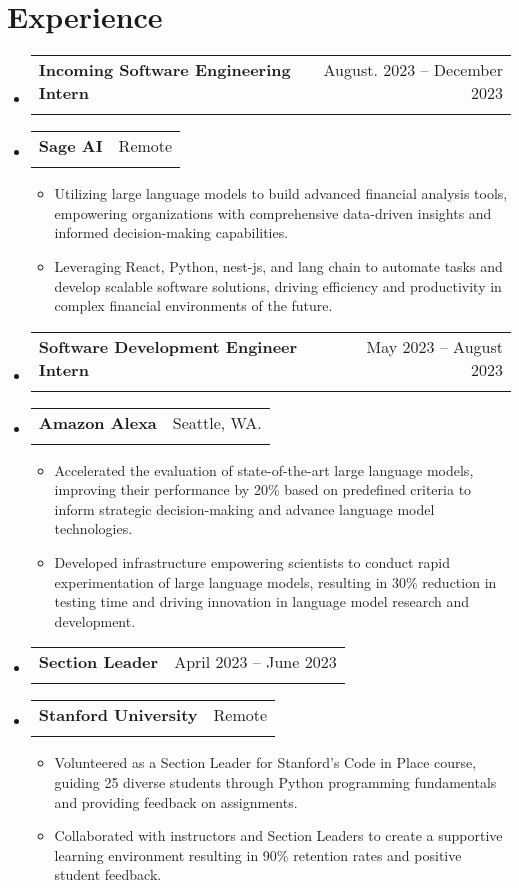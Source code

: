 \documentclass[letterpaper,11pt]{article}
\makeatletter
\newcommand{\resumeItem}[1]{
  \item\small{
    {#1 \vspace{-2pt}}
  }
}
\newcommand{\resumeSubheading}[4]{
  \vspace{-2pt}\item
    \begin{tabular*}{0.97\textwidth}[t]{l@{\extracolsep{\fill}}r}
      \textbf{#1} & #2 \\
      \textit{\small#3} & \textit{\small #4} \\
    \end{tabular*}\vspace{-7pt}
}
\newcommand{\resumeSubHeadingListStart}{\begin{itemize}[leftmargin=0.15in, label={}]}
\newcommand{\resumeSubHeadingListEnd}{\end{itemize}}
\newcommand{\resumeItemListStart}{\begin{itemize}}
\newcommand{\resumeItemListEnd}{\end{itemize}\vspace{-5pt}}
\makeatother
\begin{document}
\section{Experience}
\resumeSubHeadingListStart
\resumeSubheading
{Incoming Software Engineering Intern}{August. 2023 -- December 2023}
{\vspace{-20pt}}{\vspace{-20pt}}
\vspace{-10pt}
\resumeSubheading
{Sage AI}{Remote}
{}{}
\resumeItemListStart
\vspace{-10pt}
\resumeItem{Utilizing large language models to build advanced financial analysis tools, empowering organizations with comprehensive data-driven insights and informed decision-making capabilities.}
\resumeItem{Leveraging React, Python, nest-js, and lang chain to automate tasks and develop scalable software solutions, driving efficiency and productivity in complex financial environments of the future.}
\resumeItemListEnd
\resumeSubHeadingListEnd

\resumeSubHeadingListStart
\resumeSubheading 
{Software Development Engineer Intern}{May 2023 -- August 2023}
{\vspace{-20pt}}{\vspace{-20pt}}
\vspace{-10pt}
\resumeSubheading
{Amazon Alexa}{Seattle, WA.}
{}{}
\resumeItemListStart
\vspace{-10pt}
\resumeItem{Accelerated the evaluation of state-of-the-art large language models, improving their performance by 20\% based on predefined criteria to inform strategic decision-making and advance language model technologies.}
\resumeItem{Developed infrastructure empowering scientists to conduct rapid experimentation of large language models, resulting in 30\% reduction in testing time and driving innovation in language model research and development.}
\resumeItemListEnd
\resumeSubHeadingListEnd

\resumeSubHeadingListStart
\resumeSubheading
{Section Leader}{April 2023 -- June 2023}
{\vspace{-20pt}}{\vspace{-20pt}}
\vspace{-10pt}
\resumeSubheading
{Stanford University}{Remote}
{}{}
\resumeItemListStart
\vspace{-10pt}
\resumeItem{Volunteered as a Section Leader for Stanford's Code in Place course, guiding 25 diverse students through Python programming fundamentals and providing feedback on assignments.}
\resumeItem{Collaborated with instructors and Section Leaders to create a supportive learning environment resulting in 90\% retention rates and positive student feedback.}
\resumeItemListEnd
\resumeSubHeadingListEnd
\end{document}
